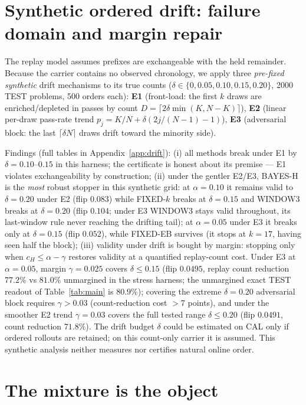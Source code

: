 \documentclass{article}
\theoremstyle{definition}
\theoremstyle{remark}
\newcommand{\cert}{c_H}
\begin{document}
\section{Synthetic ordered drift: failure domain and margin repair}
\label{sec:drift}

The replay model assumes prefixes are exchangeable with the held remainder.
Because the carrier contains no observed chronology, we apply three
\emph{pre-fixed synthetic} drift mechanisms to its true counts
($\delta\in\{0,0.05,0.10,0.15,0.20\}$, 2000 TEST problems, 500 orders each):
\textbf{E1} (front-load: the first $k$ draws are enriched/depleted in passes
by count $D=\lceil 2\delta\min(K,N{-}K)\rceil$), \textbf{E2} (linear per-draw
pass-rate trend $p_j=K/N+\delta(2j/(N{-}1){-}1)$), \textbf{E3} (adversarial
block: the last $\lceil\delta N\rceil$ draws drift toward the minority side).

Findings (full tables in Appendix~\ref{app:drift}):
(i) all methods break under E1 by $\delta=0.10$--$0.15$ in this harness; the certificate is
honest about its premise --- E1 violates exchangeability by construction;
(ii) under the gentler E2/E3, BAYES-H is the \emph{most} robust stopper in this synthetic grid: at
$\alpha=0.10$ it remains valid to $\delta=0.20$ under E2 (flip $0.083$) while
FIXED-$k$ breaks at $\delta=0.15$ and WINDOW3 breaks at $\delta=0.20$
(flip $0.104$; under E3 WINDOW3 stays valid throughout, its last-window
rule never reaching the drifting tail); at $\alpha=0.05$ under E3 it
breaks only at $\delta=0.15$ (flip $0.052$), while FIXED-EB survives (it stops
at $k=17$, having seen half the block); (iii) validity under drift is bought
by margin: stopping only when $\cert\le\alpha-\gamma$ restores validity at a
quantified replay-count cost. Under E3 at $\alpha=0.05$, margin $\gamma=0.025$
covers $\delta\le0.15$ (flip $0.0495$, replay count reduction $77.2\%$ vs $81.0\%$
unmargined in the stress harness; the unmargined exact TEST readout of
Table~\ref{tab:main} is $80.9\%$); covering the extreme $\delta=0.20$
adversarial block requires
$\gamma>0.03$ (count-reduction cost $>7$ points), and under the smoother E2 trend
$\gamma=0.03$ covers the full tested range $\delta\le0.20$ (flip $0.0491$,
count reduction $71.8\%$). The drift budget $\delta$ could be estimated on CAL
only if ordered rollouts are retained; on this count-only carrier it is assumed.
This synthetic analysis neither measures nor certifies natural online order.

\section{The mixture is the object}
\label{sec:mixture}
\end{document}
